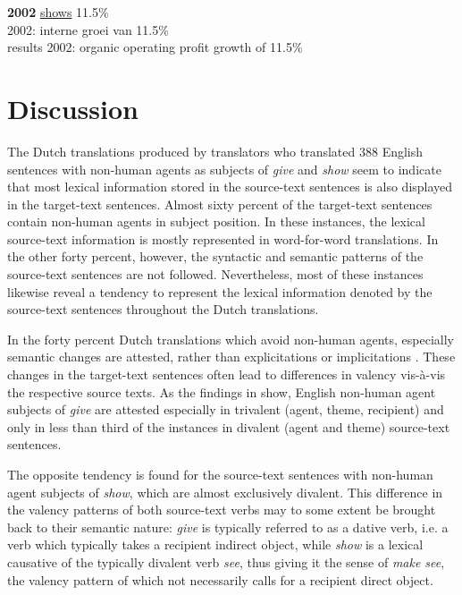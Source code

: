 \documentclass[output=paper]{LSP/langsci}
\begin{document}

\ea \label{ex:5:21}
\ea
\textbf{2002}  \ul{shows} 11.5\% \\[1em]
\ex {} 2002: interne groei  van 11.5\%\\
results 2002: organic operating profit growth of 11.5\%
\z
\z




\section{Discussion}

The Dutch translations produced by translators who translated 388 English sentences with non-human agents as subjects of \textit{give} and \textit{show} seem to indicate that most lexical information stored in the source-text sentences is also displayed in the target-text sentences. Almost sixty percent of the target-text sentences contain non-human agents in subject position. In these instances, the lexical source-text information is mostly represented in word-for-word translations. In the other forty percent, however, the syntactic and semantic patterns of the source-text sentences are not followed. Nevertheless, most of these instances likewise reveal a tendency to represent the lexical information denoted by the source-text sentences throughout the Dutch translations.

In the forty percent Dutch translations which avoid non-human agents, especially semantic changes are attested, rather than explicitations or implicitations \citep[see][]{Vandepitte2007}. These changes in the target-text sentences often lead to differences in valency vis-à-vis the respective source texts. As the findings in  show, English non-human agent subjects of \textit{give} are attested especially in trivalent (agent, theme, recipient) and only in less than third of the instances in divalent (agent and theme) source-text sentences. 	

The opposite tendency is found for the source-text sentences with non-human agent subjects of \textit{show}, which are almost exclusively divalent. This difference in the valency patterns of both source-text verbs may to some extent be brought back to their semantic nature: \textit{give} is typically referred to as a dative verb, i.e. a verb which typically takes a recipient indirect object, while \textit{show} is a lexical causative of the typically divalent verb \textit{see}, thus giving it the sense of \textit{make see}, the valency pattern of which not necessarily calls for a recipient direct object.
\end{document}
